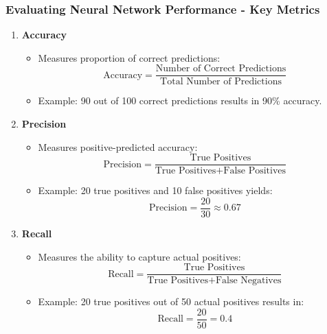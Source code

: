 \documentclass[aspectratio=169]{beamer}
\begin{document}
\begin{frame}[fragile]
    \frametitle{Evaluating Neural Network Performance - Key Metrics}
    \begin{enumerate}
        \item \textbf{Accuracy}
        \begin{itemize}
            \item Measures proportion of correct predictions:
            \begin{equation}
                \text{Accuracy} = \frac{\text{Number of Correct Predictions}}{\text{Total Number of Predictions}} 
            \end{equation}
            \item Example: 90 out of 100 correct predictions results in 90\% accuracy.
        \end{itemize}
        
        \item \textbf{Precision}
        \begin{itemize}
            \item Measures positive-predicted accuracy:
            \begin{equation}
                \text{Precision} = \frac{\text{True Positives}}{\text{True Positives} + \text{False Positives}} 
            \end{equation}
            \item Example: 20 true positives and 10 false positives yields:
            \begin{equation}
                \text{Precision} = \frac{20}{30} \approx 0.67
            \end{equation}
        \end{itemize}
        
        \item \textbf{Recall}
        \begin{itemize}
            \item Measures the ability to capture actual positives:
            \begin{equation}
                \text{Recall} = \frac{\text{True Positives}}{\text{True Positives} + \text{False Negatives}} 
            \end{equation}
            \item Example: 20 true positives out of 50 actual positives results in:
            \begin{equation}
                \text{Recall} = \frac{20}{50} = 0.4
            \end{equation}
        \end{itemize}
    \end{enumerate}
\end{frame}
\end{document}
